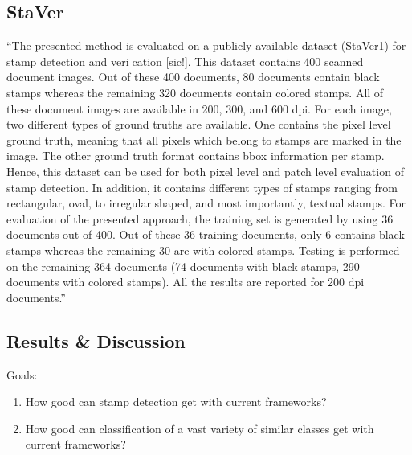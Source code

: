 \subsection{StaVer}\label{sect:staver}
``The presented method is evaluated on a publicly available dataset (StaVer1) for stamp
detection and verication [sic!]. This dataset contains 400 scanned document images. Out
of these 400 documents, 80 documents contain black stamps whereas the remaining 320
documents contain colored stamps. All of these document images are available in 200,
300, and 600 dpi. For each image, two different types of ground truths are available.
One contains the pixel level ground truth, meaning that all pixels which belong to
stamps are marked in the image. The other ground truth format contains \gls{bbox}
information per stamp. Hence, this dataset can be used for both pixel level and
patch level evaluation of stamp detection. In addition, it contains different types of
stamps ranging from rectangular, oval, to irregular shaped, and most importantly, textual
stamps.
For evaluation of the presented approach, the training set is generated by using 36 documents
out of 400. Out of these 36 training documents, only 6 contains black stamps
whereas the remaining 30 are with colored stamps. Testing is performed on the remaining
364 documents (74 documents with black stamps, 290 documents with colored stamps).
All the results are reported for 200 dpi documents.''~\cite{Ahmed.2016}

\subsection{Results \& Discussion}\label{sect:results-and-discussion}
Goals: 
\begin{enumerate}
    \item How good can stamp detection get with current frameworks?
    \item How good can classification of a vast variety of similar classes get
    with current frameworks?
\end{enumerate}
